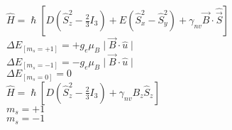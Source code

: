 \documentclass{report}
\begin{document}
      $\hat{H} = \hslash [ D (\hat{S}_z^2 - \frac{2}{3} I_3) + E (\hat{S}_x^2 - \hat{S}_y^2) + \gamma_{nv} \vec{B} \cdot \hat{\vec{S}} ]$\\
      $\Delta E_{[m_s = +1]} = + g_e \mu_B \mid \vec{B} \cdot \hat{u} \mid$ \\
      $\Delta E_{[m_s = -1]} = - g_e \mu_B \mid\vec{B} \cdot \hat{u} \mid$ \\
      $\Delta E_{[m_s = 0]} = 0$ \\
      $\hat{H} = \hslash [ D (\hat{S}_z^2 - \frac{2}{3} I_3) + \gamma_{nv} B_z \hat{S}_z ]$\\
      $m_s = +1$ \\
      $m_s = -1$ \\
\end{document}
